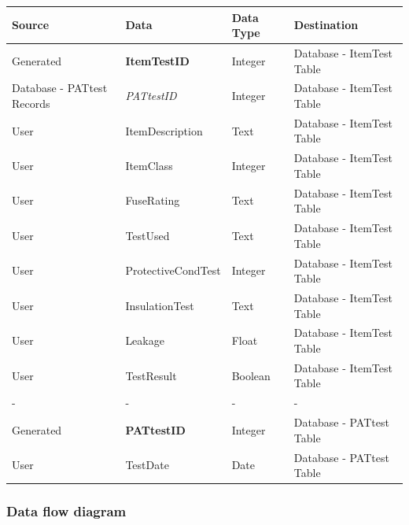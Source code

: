\begin{center}
        \begin{tabular}{|p{2cm}|p{3cm}|p{3cm}|p{3cm}|}
            \hline
            \textbf{Source} & \textbf{Data} & \textbf{Data Type} & \textbf{Destination} \\ \hline
            Generated & \textbf{ItemTestID} & Integer & Database - ItemTest Table \\ \hline
            Database - PATtest Records & \emph{PATtestID} & Integer & Database - ItemTest Table \\ \hline
            User & ItemDescription & Text & Database - ItemTest Table \\ \hline
            User & ItemClass & Integer & Database - ItemTest Table \\ \hline
            User & FuseRating & Text & Database - ItemTest Table \\ \hline
            User & TestUsed & Text & Database - ItemTest Table \\ \hline 
            User & ProtectiveCondTest & Integer & Database - ItemTest Table \\ \hline
            User & InsulationTest & Text & Database - ItemTest Table \\ \hline
            User & Leakage & Float & Database - ItemTest Table \\ \hline
            User & TestResult & Boolean & Database - ItemTest Table \\ \hline
            - & - & - & - \\ \hline
            Generated & \textbf{PATtestID} & Integer & Database - PATtest Table \\ \hline
            User & TestDate & Date & Database - PATtest Table \\ \hline
        \end{tabular}
\end{center}


\subsubsection{Data flow diagram}


